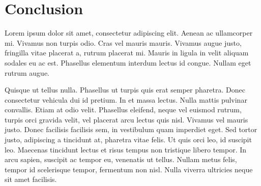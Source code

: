 \chapter{Conclusion}

Lorem ipsum dolor sit amet, consectetur adipiscing elit. Aenean ac
ullamcorper mi. Vivamus non turpis odio. Cras vel mauris mauris. Vivamus
augue justo, fringilla vitae placerat a, rutrum placerat mi. Mauris in
ligula in velit aliquam sodales eu ac est. Phasellus elementum interdum
lectus id congue. Nullam eget rutrum augue.

Quisque ut tellus nulla. Phasellus ut turpis quis erat semper pharetra.
Donec consectetur vehicula dui id pretium. In et massa lectus. Nulla mattis
pulvinar convallis. Etiam at odio velit. Phasellus eleifend, neque vel
euismod rutrum, turpis orci gravida velit, vel placerat arcu lectus quis
nisl. Vivamus vel mauris justo. Donec facilisis facilisis sem, in vestibulum
quam imperdiet eget. Sed tortor justo, adipiscing a tincidunt at, pharetra
vitae felis. Ut quis orci leo, id suscipit leo. Maecenas tincidunt lectus et
risus tempus non tristique libero tempor. In arcu sapien, suscipit ac tempor
eu, venenatis ut tellus. Nullam metus felis, tempor id scelerisque tempor,
fermentum non nisl. Nulla viverra ultricies neque sit amet facilisis.